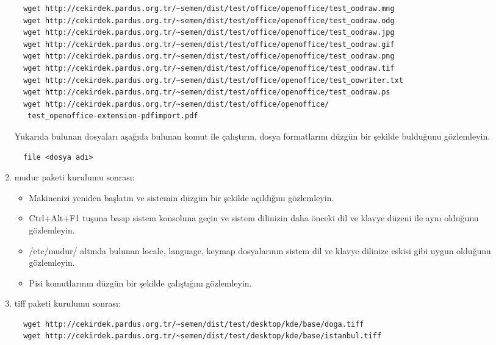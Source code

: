 \documentclass[a4paper,10pt]{article}
\begin{document}
\begin{enumerate}
\begin{verbatim}
  wget http://cekirdek.pardus.org.tr/~semen/dist/test/office/openoffice/test_oodraw.mng
  wget http://cekirdek.pardus.org.tr/~semen/dist/test/office/openoffice/test_oodraw.odg
  wget http://cekirdek.pardus.org.tr/~semen/dist/test/office/openoffice/test_oodraw.jpg
  wget http://cekirdek.pardus.org.tr/~semen/dist/test/office/openoffice/test_oodraw.gif
  wget http://cekirdek.pardus.org.tr/~semen/dist/test/office/openoffice/test_oodraw.png
  wget http://cekirdek.pardus.org.tr/~semen/dist/test/office/openoffice/test_oodraw.tif
  wget http://cekirdek.pardus.org.tr/~semen/dist/test/office/openoffice/test_oowriter.txt
  wget http://cekirdek.pardus.org.tr/~semen/dist/test/office/openoffice/test_oodraw.ps
  wget http://cekirdek.pardus.org.tr/~semen/dist/test/office/openoffice/
   test_openoffice-extension-pdfimport.pdf
\end{verbatim}

Yukarıda bulunan dosyaları aşağıda bulunan komut ile çalıştırın, dosya formatlarını düzgün bir şekilde bulduğunu gözlemleyin.
\begin{verbatim}
  file <dosya adı>
\end{verbatim}

\item mudur paketi kurulumu sonrası:

\begin{itemize}
  \item Makinenizi yeniden başlatın ve sistemin düzgün bir şekilde açıldığını  gözlemleyin.
 \item Ctrl+Alt+F1 tuşuna basıp sistem konsoluna geçin ve sistem dilinizin daha önceki dil ve klavye düzeni ile aynı olduğunu gözlemleyin.
  \item /etc/mudur/ altında bulunan locale, language, keymap dosyalarının sistem dil ve klavye dilinize eskisi gibi uygun olduğunu gözlemleyin.
 \item Pisi komutlarının düzgün bir şekilde çalıştığını gözlemleyin. 

\end{itemize}
\item tiff paketi kurulumu sonrası:
\begin{verbatim}
  wget http://cekirdek.pardus.org.tr/~semen/dist/test/desktop/kde/base/doga.tiff
  wget http://cekirdek.pardus.org.tr/~semen/dist/test/desktop/kde/base/istanbul.tiff
\end{verbatim}


\end{enumerate}
\end{document}
